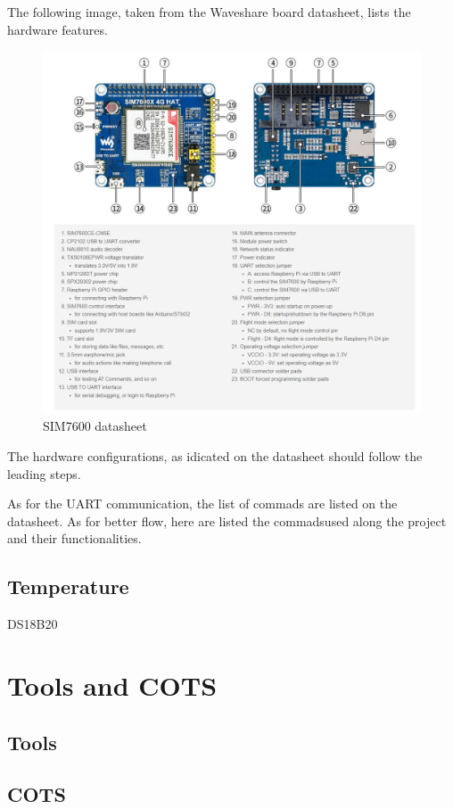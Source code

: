 The following image, taken from the Waveshare board datasheet, lists the hardware features.
\begin{figure}[H]%
    \centering
    \includegraphics[width=1\textwidth]{images/chapter/design/SIM7600_board.png}
    \caption{SIM7600 datasheet}
    \label{fig:SIM7600 datasheet}
\end{figure}

The hardware configurations, as idicated on the datasheet should follow the leading steps.

As for the UART communication, the list of commads are listed on the datasheet. 
As for better flow, here are listed the commadsused along the project and their functionalities. 

\subsection{Temperature}
DS18B20


\section{Tools and COTS}
\subsection{Tools}
\subsection{COTS}
